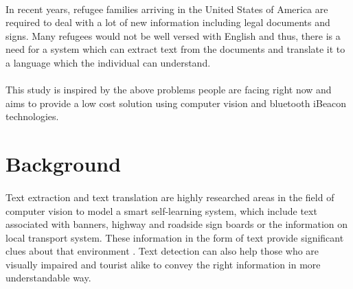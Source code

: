 \documentclass[12pt]{article}
\begin{document}
\paragraph{} In recent years, refugee families arriving in the United States of America are required to deal with a lot of new information including legal documents and signs. Many refugees would not be well versed with English and thus, there is a need for a system which can extract text from the documents and translate it to a language which the individual can understand. 

\paragraph{}This study is inspired by the above problems people are facing right now and aims to provide a low cost solution using computer vision and bluetooth iBeacon technologies.




\section{Background}
\label{sect-background}

\paragraph{}Text extraction and text translation are highly researched areas in the field of computer vision to model a smart self-learning system, which include text associated with banners, highway and roadside sign boards or the information on local transport system. These information in the form of text provide significant clues about that environment \cite{india}. Text detection can also help those who are visually impaired and tourist alike to convey the right information in more understandable way.\cite{india}
\end{document}
